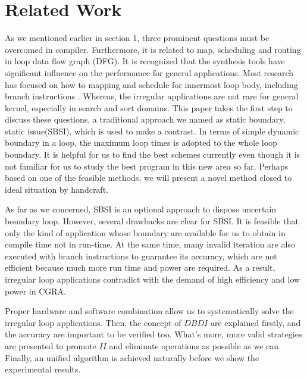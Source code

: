 \documentclass[10pt, conference, compsocconf]{IEEEtran}
\begin{document}
\section{Related Work}
As we mentioned earlier in section 1, three prominent questions must be overcomed in compiler. Furthermore, it is related to map, scheduling and routing in loop data flow graph (DFG). It is recognized that  the synthesis tools have significant influence on the performance for general applications. Most research has focused on how to mapping and schedule for innermost loop body, including branch instructions \cite{re-ahn2006spatial,re-dimitroulakos2006exploring,re-friedman2009spr,re-guo2006pattern,re-hatanaka2007modulo,re-lee2003compilation}. Whereas, the irregular applications are not rare for general kernel, especially in search and sort domains. This paper takes the first step to discuss these questions, a traditional approach we named as static boundary, static issue(SBSI), which is used to make a contrast. In terms of simple dynamic boundary in a loop, the maximum loop times is adopted to the whole loop boundary. It is helpful for us to find the best schemes currently even though it is not familiar for us to study the best program in this new area so far. Perhaps based on one of the feasible methods, we will present a novel method closed to ideal situation by handcraft. 

As far as we concerned, SBSI is an optional approach to dispose uncertain boundary loop. However, several drawbacks are clear for SBSI. It is feasible  that only the kind of application whose boundary are available for us to obtain in compile time not in run-time. At the same time, many invalid iteration are also executed with branch instructions to guarantee its accuracy, which are not efficient because much more run time and power are required. As a result, irregular loop applications contradict with the demand of high efficiency and low power in CGRA.

Proper hardware and software combination allow us to systematically solve the irregular loop applications. Then, the concept of $DBDI$ are explained firstly, and the accuracy are important to be verified too. What’s more, more valid strategies are presented to promote $II$ and eliminate operations as possible as we can. Finally, an unified algorithm is achieved naturally before we show the experimental results.

\end{document}
